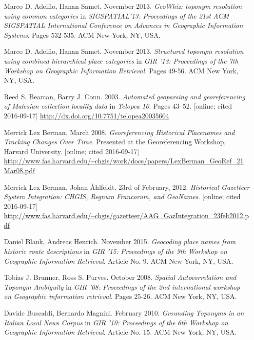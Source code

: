 \documentclass[11pt]{article}
\begin{document}
\newpage
\begin{thebibliography}{9}
  
  Marco D. Adelfio, Hanan Samet. November 2013. \emph{GeoWhiz: toponym resolution using common categories} in \emph{SIGSPATIAL'13: Proceedings of the 21st ACM SIGSPATIAL International Conference on Advances in Geographic Information Systems}. Pages 532-535. ACM New York, NY, USA.

  Marco D. Adelfio, Hanan Samet. November 2013. \emph{Structured toponym resolution using combined hierarchical place categories} in \emph{GIR '13: Proceedings of the 7th Workshop on Geographic Information Retrieval}. Pages 49-56. ACM New York, NY, USA.

  Reed S. Beaman, Barry J. Conn. 2003. \emph{Automated geoparsing and georeferencing of Malesian collection locality data} in \emph{Telopea 10}. Pages 43–52. [online; cited 2016-09-17] \url{http://dx.doi.org/10.7751/telopea20035604}

  Merrick Lex Berman. March 2008. \emph{Georeferencing Historical Placenames and Tracking Changes Over Time}. Presented at the Georeferencing Workshop, Harvard University. [online; cited 2016-09-17] \url{http://www.fas.harvard.edu/~chgis/work/docs/papers/LexBerman_GeoRef_21Mar08.pdf}
  
  Merrick Lex Berman, Johan \r{A}hlfeldt. 23rd of February, 2012. \emph{Historical Gazetteer System Integration: CHGIS, Regnum Francorum, and GeoNames}. [online; cited 2016-09-17] \url{http://www.fas.harvard.edu/~chgis/gazetteer/AAG_GazIntegration_23feb2012.pdf}
  
  Daniel Blank, Andreas Henrich. November 2015. \emph{Geocoding place names from historic route descriptions} in \emph{GIR '15: Proceedings of the 9th Workshop on Geographic Information Retrieval}. Article No. 9. ACM New York, NY, USA.
  
  Tobias J. Brunner, Ross S. Purves. October 2008. \emph{Spatial Autocorrelation and Toponym Ambiguity} in \emph{GIR '08: Proceedings of the 2nd international workshop on Geographic information retrieval}. Pages 25-26. ACM New York, NY, USA.
  
  Davide Buscaldi, Bernardo Magnini. February 2010. \emph{Grounding Toponyms in an Italian Local News Corpus} in \emph{GIR '10: Proceedings of the 6th Workshop on Geographic Information Retrieval}. Article No. 15. ACM New York, NY, USA.
  

\end{thebibliography}
\end{document}
